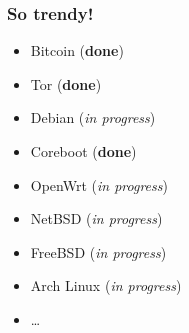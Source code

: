 \documentclass[14pt]{beamer}
\begin{document}
\begin{frame}
 \frametitle{So trendy!}

 \begin{itemize}
 \item Bitcoin (\textbf{done})
 \item Tor (\textbf{done})
 \item Debian (\emph{in progress})
 \item Coreboot (\textbf{done})
 \item OpenWrt (\emph{in progress})
 \item NetBSD (\emph{in progress})
 \item FreeBSD (\emph{in progress})
 \item Arch Linux (\emph{in progress})
 \item \ldots{}
\end{itemize}

\end{frame}


\begin{frame}[plain]
\end{frame}
\end{document}
